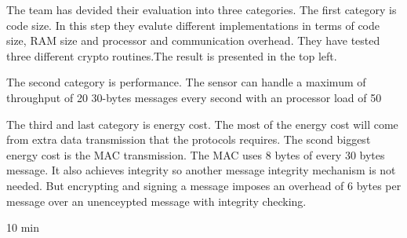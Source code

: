 \tiny
The team has devided their evaluation into three categories.
The first category is code size. In this step they evalute different implementations in terms of code size, RAM size and processor and communication overhead. They have tested three different crypto routines.The result is presented in the top left.

\bigskip


The second category is performance. The sensor can handle a maximum of throughput of 20 30-bytes messages every second with an processor load of 50%

\bigskip


The third and last category is energy cost. The most of the energy cost will come from extra data transmission that the protocols requires. The scond biggest energy cost is the MAC transmission. The MAC uses 8 bytes of every 30 bytes message. It also achieves integrity so another message integrity mechanism is not needed. But encrypting and signing a message imposes an overhead of 6 bytes per message over an unenceypted message with integrity checking.

\Large{10 min}